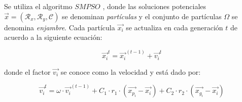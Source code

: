 \documentclass[spanish,twocolumn]{article}
\begin{document}
Se utiliza el algoritmo $SMPSO$ \cite{nebro2009smpso}, donde las soluciones potenciales $\overrightarrow{x}=(\mathcal{R}_x, \mathcal{R}_y, \mathcal{C})$ se denominan {\it partículas} y el conjunto de partículas $\Omega$ se denomina {\it enjambre}. Cada partícula $\overrightarrow{x_i}$ se actualiza en cada generación $t$ de acuerdo a la siguiente ecuación:

\begin{equation}\label{eq:psobasico}
\overrightarrow{x_i}^t = \overrightarrow{x_i}^{(t-1)} + \overrightarrow{v_i}^t
\end{equation}

donde el factor $\overrightarrow{v_i}$ se conoce como la velocidad y está dado por:

\begin{equation}\label{eq:psobasico2}
\overrightarrow{v_i}^t = \omega \cdot \overrightarrow{v_i}^{(t-1)} + C_1 \cdot r_1 \cdot (\overrightarrow{x_{p_i}}-\overrightarrow{x_i}) + C_2 \cdot r_2 \cdot (\overrightarrow{x_{g_i}}-\overrightarrow{x_i})
\end{equation}
\end{document}
